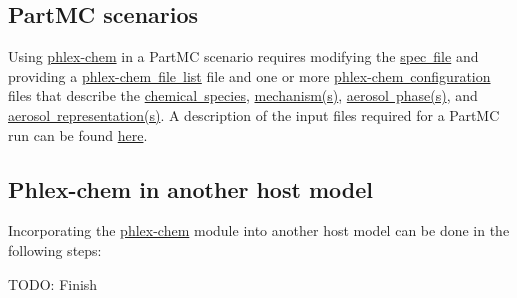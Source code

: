 \subsection*{Part\+MC scenarios}

Using \mbox{\hyperlink{phlex_chem}{phlex-\/chem}} in a Part\+MC scenario requires modifying the \mbox{\hyperlink{input_format}{spec file}} and providing a \mbox{\hyperlink{input_format_phlex_file_list}{phlex-\/chem file list}} file and one or more \mbox{\hyperlink{input_format_phlex_config}{phlex-\/chem configuration}} files that describe the \mbox{\hyperlink{phlex_species}{chemical species}}, \mbox{\hyperlink{phlex_mechanism}{mechanism(s)}}, \mbox{\hyperlink{phlex_aero_phase}{aerosol phase(s)}}, and \mbox{\hyperlink{phlex_aero_rep}{aerosol representation(s)}}. A description of the input files required for a Part\+MC run can be found \mbox{\hyperlink{input_format}{here}}.

\subsection*{Phlex-\/chem in another host model}

Incorporating the \mbox{\hyperlink{phlex_chem}{phlex-\/chem}} module into another host model can be done in the following steps\+:

T\+O\+DO\+: Finish 